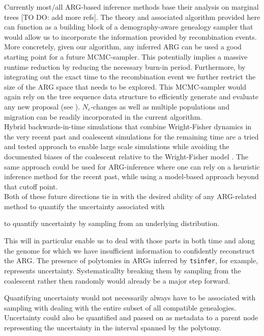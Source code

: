 \documentclass{article}
\newcommand{\tsinfer}[0]{\texttt{tsinfer}}
\begin{document}
Currently most/all ARG-based inference methods base their analysis on marginal 
trees \citep{hejase_2022} [TO DO: add more refs]. The theory and associated algorithm 
provided here can function as a building block of a 
demography-aware genealogy sampler that would allow us to incorporate the information 
provided by recombination events.
More concretely, given our algorithm, any inferred ARG can be used a good starting point 
for a future MCMC-sampler. This potentially implies a massive runtime reduction by 
reducing the necessary burn-in period. Furthermore, by integrating out the exact time 
to the recombination event we further restrict the size of the ARG space that needs to 
be explored. This MCMC-sampler would again rely on the tree sequence data structure to 
efficiently generate and evaluate any new proposal (see \citep{mahmoudi_bayesian_2022}). 
$N_e$-changes as well as multiple populations and migration can be readily incorporated 
in the current algorithm.\\


Hybrid backwards-in-time simulations that combine Wright-Fisher dynamics in the 
very recent past and coalescent simulations for the remaining time are a tried and tested 
approach \citep{bhaskar_distortion_2014, nelson_accounting_2020} to enable large scale 
simulations while avoiding the documented biases of the coalescent relative to the 
Wright-Fisher model \citep{bhaskar_distortion_2014, wakeley_gene_2012}. The same approach 
could be used for ARG-inference where one can rely on a heuristic inference method for 
the recent past, while using a model-based approach beyond that cutoff point.\\

Both of these future directions tie in with the desired ability of any ARG-related method to 
quantify the uncertainty associated with 


to quantify uncertainty by sampling 
from an underlying distribution. 

This will in particular enable us to deal with those 
parts in both time and along the genome for which we have insufficient information to confidently 
reconstruct the ARG. The presence of polytomies in ARGs inferred by \tsinfer, for example, 
represents uncertainty. Systematicallty breaking them by sampling from the coalescent rather 
then randomly would already be a major step forward. 


Quantifying uncertainty would not necessarily always have to be associated 
with sampling 
with dealing with the entire subset of all compatible genealogies. Uncertainty could also 
be quantified and passed on as metadata to a parent node representing the uncertainty 
in the interval spanned by the polytomy.
\end{document}
